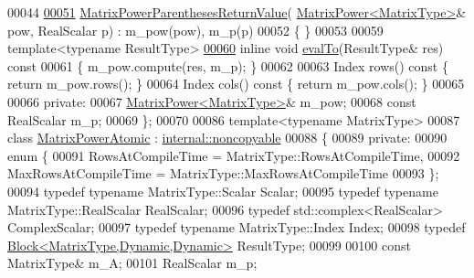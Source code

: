\begin{DoxyCode}
00044 
\hyperlink{class_eigen_1_1_matrix_power_parentheses_return_value_ae3a02d943a31427a6dc8c1f60f3367d7}{00051}     \hyperlink{class_eigen_1_1_matrix_power_parentheses_return_value_ae3a02d943a31427a6dc8c1f60f3367d7}{MatrixPowerParenthesesReturnValue}(
      \hyperlink{class_eigen_1_1_matrix_power}{MatrixPower<MatrixType>}& pow, RealScalar p) : m\_pow(pow), m\_p(p)
00052     \{ \}
00053 
00059     \textcolor{keyword}{template}<\textcolor{keyword}{typename} ResultType>
\hyperlink{class_eigen_1_1_matrix_power_parentheses_return_value_a4022dd383b54272e53e52f4f7059579f}{00060}     \textcolor{keyword}{inline} \textcolor{keywordtype}{void} \hyperlink{class_eigen_1_1_matrix_power_parentheses_return_value_a4022dd383b54272e53e52f4f7059579f}{evalTo}(ResultType& res)\textcolor{keyword}{ const}
00061 \textcolor{keyword}{    }\{ m\_pow.compute(res, m\_p); \}
00062 
00063     Index rows()\textcolor{keyword}{ const }\{ \textcolor{keywordflow}{return} m\_pow.rows(); \}
00064     Index cols()\textcolor{keyword}{ const }\{ \textcolor{keywordflow}{return} m\_pow.cols(); \}
00065 
00066   \textcolor{keyword}{private}:
00067     \hyperlink{class_eigen_1_1_matrix_power}{MatrixPower<MatrixType>}& m\_pow;
00068     \textcolor{keyword}{const} RealScalar m\_p;
00069 \};
00070 
00086 \textcolor{keyword}{template}<\textcolor{keyword}{typename} MatrixType>
00087 \textcolor{keyword}{class }\hyperlink{class_eigen_1_1_matrix_power_atomic}{MatrixPowerAtomic} : \hyperlink{class_eigen_1_1internal_1_1noncopyable}{internal::noncopyable}
00088 \{
00089   \textcolor{keyword}{private}:
00090     \textcolor{keyword}{enum} \{
00091       RowsAtCompileTime = MatrixType::RowsAtCompileTime,
00092       MaxRowsAtCompileTime = MatrixType::MaxRowsAtCompileTime
00093     \};
00094     \textcolor{keyword}{typedef} \textcolor{keyword}{typename} MatrixType::Scalar Scalar;
00095     \textcolor{keyword}{typedef} \textcolor{keyword}{typename} MatrixType::RealScalar RealScalar;
00096     \textcolor{keyword}{typedef} std::complex<RealScalar> ComplexScalar;
00097     \textcolor{keyword}{typedef} \textcolor{keyword}{typename} MatrixType::Index Index;
00098     \textcolor{keyword}{typedef} \hyperlink{group___core___module_class_eigen_1_1_block}{Block<MatrixType,Dynamic,Dynamic>} ResultType;
00099 
00100     \textcolor{keyword}{const} MatrixType& m\_A;
00101     RealScalar m\_p;

\end{DoxyCode}

